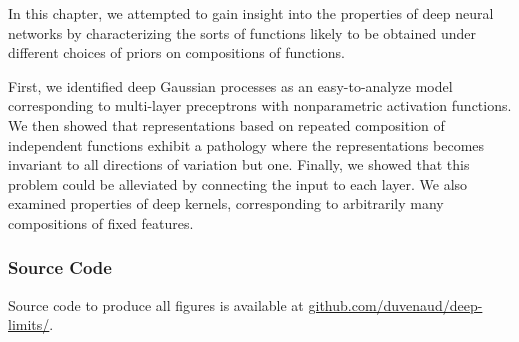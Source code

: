 
In this chapter, we attempted to gain insight into the properties of deep neural networks by characterizing the sorts of functions likely to be obtained under different choices of priors on compositions of functions.

First, we identified deep Gaussian processes as an easy-to-analyze model corresponding to multi-layer preceptrons with nonparametric activation functions.
%
We then showed that representations based on repeated composition of independent functions exhibit a pathology where the representations becomes invariant to all directions of variation but one. %
Finally, we showed that this problem could be alleviated by connecting the input to each layer.
%
We also examined properties of deep kernels, corresponding to arbitrarily many compositions of fixed features.

\subsubsection{Source Code}
Source code to produce all figures is available at \url{github.com/duvenaud/deep-limits/}. 




